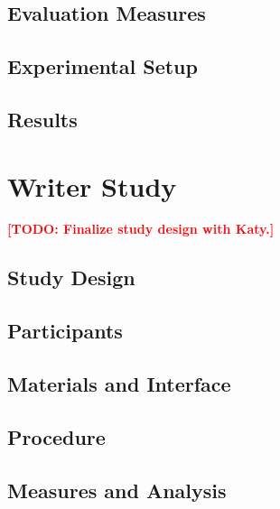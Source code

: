 \documentclass[sigconf,nonacm]{acmart}
\newcommand{\todo}[1]{\textcolor{red}{\textbf{[TODO: #1]}}}
\begin{document}
\subsection{Evaluation Measures}
%
%

\subsection{Experimental Setup}

\subsection{Results}


\section{Writer Study}
\todo{Finalize study design with Katy.}
\subsection{Study Design}

\subsection{Participants}

\subsection{Materials and Interface}

\subsection{Procedure}

\subsection{Measures and Analysis}
\end{document}
